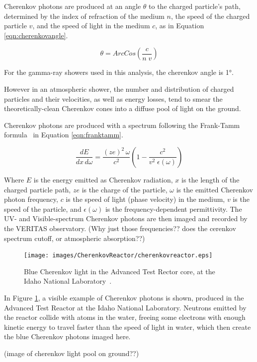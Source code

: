   Cherenkov photons are produced at an angle $\theta$ to the charged particle's path, determined by the index of refraction of the medium $n$, the speed of the charged particle $v$, and the speed of light in the medium $c$, as in Equation \ref{eqn:cherenkovangle}.

  \begin{equation}\label{eqn:cherenkovangle}
    \theta = ArcCos \left ( \frac{c}{n \; v} \right )
  \end{equation}
  
  For the gamma-ray showers used in this analysis, the cherenkov angle is \nicetilde\ang{1}.

  However in an atmospheric shower, the number and distribution of charged particles and their velocities, as well as energy losses, tend to smear the theoretically-clean Cherenkov cones into a diffuse pool of light on the ground.
  
  Cherenkov photons are produced with a spectrum following the Frank-Tamm formula~\cite{franktamm1,franktamm2} in Equation \ref{eqn:franktamm}.
  
  \begin{equation}\label{eqn:franktamm}
    \frac{dE}{dx\,d\omega}=\frac{(ze)^2 \, \omega}{c^2} \left ( 1 - \frac{c^2}{v^2 \;\epsilon(\omega)} \right )
  \end{equation}
  
  Where $E$ is the energy emitted as Cherenkov radiation, $x$ is the length of the charged particle path, $ze$ is the charge of the particle, $\omega$ is the emitted Cherenkov photon frequency, $c$ is the speed of light (phase velocity) in the medium, $v$ is the speed of the particle, and $\epsilon(\omega)$ is the frequency-dependent permittivity.
  The UV- and Visible-spectrum Cherenkov photons are then imaged and recorded by the VERITAS observatory.
  {\color{red}(Why just those frequencies?? does the cerenkov spectrum cutoff, or atmospheric absorption??)}
  
  \begin{figure}[ht]
    \centering
    \texttt{[image: images/CherenkovReactor/cherenkovreactor.eps]}
    \caption[Chernekov Light from a Reactor]{
      Blue Cherenkov light in the Advanced Test Rector core, at the Idaho National Laboratory~\cite{cherenkovreactor,atrlab}.
    }
    \label{fig:cherenkovreactor}
  \end{figure}
  In Figure \ref{fig:cherenkovreactor}, a visible example of Cherenkov photons is shown, produced in the Advanced Test Reactor at the Idaho National Laboratory.
  Neutrons emitted by the reactor collide with atoms in the water, freeing some electrons with enough kinetic energy to travel faster than the speed of light in water, which then create the blue Cherenkov photons imaged here.
  
  {\color{red}(image of cherenkov light pool on ground??)}
  
  
